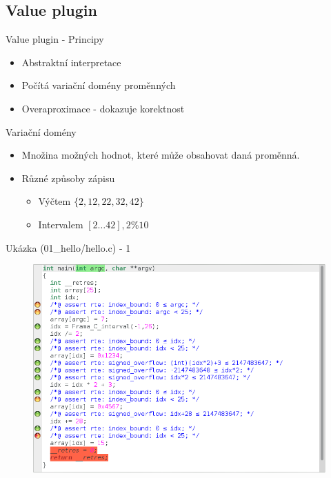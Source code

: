 \documentclass[11pt]{beamer}
\begin{document}
\subsection{Value plugin}

\begin{frame}{Value plugin - Principy}
	\begin{itemize}
			\item Abstraktní interpretace
			\item Počítá variační domény proměnných
			\item Overaproximace - dokazuje korektnost
	\end{itemize}
\end{frame}

\begin{frame}{Variační domény}
	\begin{itemize}
			\item Množina možných hodnot, které může obsahovat daná proměnná.
			\item Různé způsoby zápisu
			\begin{itemize}
				\item Výčtem \( \{ 2, 12, 22, 32, 42 \} \)
				\item Intervalem \( [2 \ldots 42], 2 \% 10 \)
			\end{itemize}
	\end{itemize}
\end{frame}

\begin{frame}{Ukázka (01\_hello/hello.c) - 1}
	\begin{figure}
		\includegraphics[scale=0.3]{./img/value_01.png}
	\end{figure}
\end{frame}
\end{document}
